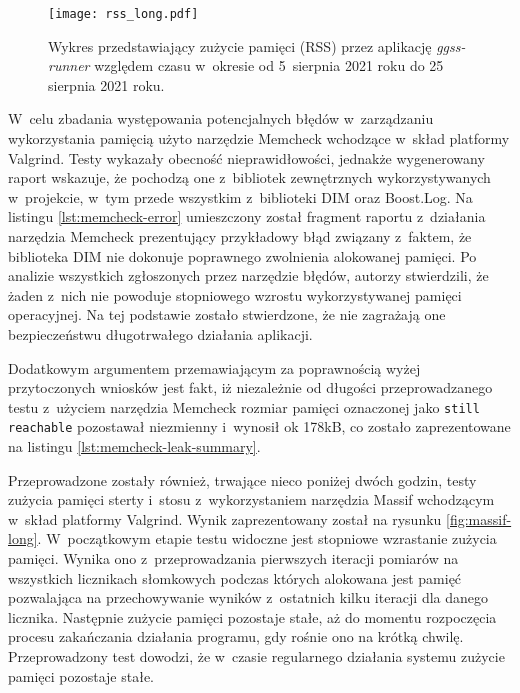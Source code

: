 \begin{figure}[H]
    \centering
    \texttt{[image: rss\_long.pdf]}
    \caption{Wykres przedstawiający zużycie pamięci (RSS) przez aplikację \emph{ggss-runner} względem czasu w~okresie od 5~sierpnia 2021 roku do 25 sierpnia 2021 roku.}
    \label{fig:rss-long}
\end{figure}

W~celu zbadania występowania potencjalnych błędów w~zarządzaniu wykorzystania pamięcią użyto narzędzie Memcheck wchodzące w~skład platformy Valgrind. Testy wykazały obecność nieprawidłowości, jednakże wygenerowany raport wskazuje, że pochodzą one z~bibliotek zewnętrznych wykorzystywanych w~projekcie, w~tym przede wszystkim z~biblioteki DIM oraz Boost.Log. Na listingu \ref{lst:memcheck-error} umieszczony został fragment raportu z~działania narzędzia Memcheck prezentujący przykładowy błąd związany z~faktem, że biblioteka DIM nie dokonuje poprawnego zwolnienia alokowanej pamięci. Po analizie wszystkich zgłoszonych przez narzędzie błędów, autorzy stwierdzili, że żaden z~nich nie powoduje stopniowego wzrostu wykorzystywanej pamięci operacyjnej. Na tej podstawie zostało stwierdzone, że nie zagrażają one bezpieczeństwu długotrwałego działania aplikacji.



Dodatkowym argumentem przemawiającym za poprawnością wyżej przytoczonych wniosków jest fakt, iż niezależnie od długości przeprowadzanego testu z~użyciem narzędzia Memcheck rozmiar pamięci oznaczonej jako \lstinline{still reachable} pozostawał niezmienny i~wynosił ok 178kB, co zostało zaprezentowane na listingu \ref{lst:memcheck-leak-summary}.



Przeprowadzone zostały również, trwające nieco poniżej dwóch godzin, testy zużycia pamięci sterty i~stosu z~wykorzystaniem narzędzia Massif wchodzącym w~skład platformy Valgrind. Wynik zaprezentowany został na rysunku \ref{fig:massif-long}. W~początkowym etapie testu widoczne jest stopniowe wzrastanie zużycia pamięci. Wynika ono z~przeprowadzania pierwszych iteracji pomiarów na wszystkich licznikach słomkowych podczas których alokowana jest pamięć pozwalająca na przechowywanie wyników z~ostatnich kilku iteracji dla danego licznika. Następnie zużycie pamięci pozostaje stałe, aż do momentu rozpoczęcia procesu zakańczania działania programu, gdy rośnie ono na krótką chwilę. Przeprowadzony test dowodzi, że w~czasie regularnego działania systemu zużycie pamięci pozostaje stałe.

